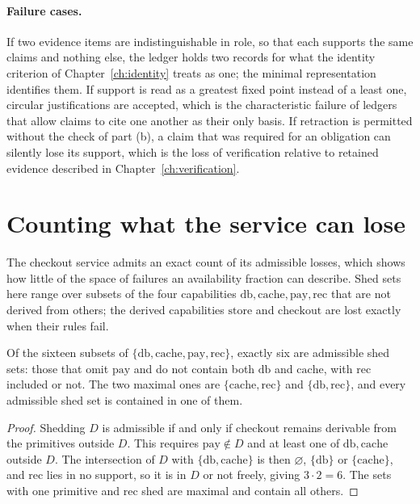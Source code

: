 \paragraph{Failure cases.} If two evidence items are indistinguishable in role, so that each supports the same claims and nothing else, the ledger holds two records for what the identity criterion of Chapter~\ref{ch:identity} treats as one; the minimal representation identifies them. If support is read as a greatest fixed point instead of a least one, circular justifications are accepted, which is the characteristic failure of ledgers that allow claims to cite one another as their only basis. If retraction is permitted without the check of part (b), a claim that was required for an obligation can silently lose its support, which is the loss of verification relative to retained evidence described in Chapter~\ref{ch:verification}.


\section{Counting what the service can lose}\label{sec:service-count}

The checkout service admits an exact count of its admissible losses, which shows how little of the space of failures an availability fraction can describe. Shed sets here range over subsets of the four capabilities $\mathrm{db},\mathrm{cache},\mathrm{pay},\mathrm{rec}$ that are not derived from others; the derived capabilities $\mathrm{store}$ and $\mathrm{checkout}$ are lost exactly when their rules fail.

\begin{newresult}\label{prop:service-count}
Of the sixteen subsets of $\{\mathrm{db},\mathrm{cache},\mathrm{pay},\mathrm{rec}\}$, exactly six are admissible shed sets: those that omit $\mathrm{pay}$ and do not contain both $\mathrm{db}$ and $\mathrm{cache}$, with $\mathrm{rec}$ included or not. The two maximal ones are $\{\mathrm{cache},\mathrm{rec}\}$ and $\{\mathrm{db},\mathrm{rec}\}$, and every admissible shed set is contained in one of them.
\end{newresult}
\begin{proof}
Shedding $D$ is admissible if and only if $\mathrm{checkout}$ remains derivable from the primitives outside $D$. This requires $\mathrm{pay}\notin D$ and at least one of $\mathrm{db},\mathrm{cache}$ outside $D$. The intersection of $D$ with $\{\mathrm{db},\mathrm{cache}\}$ is then $\varnothing$, $\{\mathrm{db}\}$ or $\{\mathrm{cache}\}$, and $\mathrm{rec}$ lies in no support, so it is in $D$ or not freely, giving $3\cdot2=6$. The sets with one primitive and $\mathrm{rec}$ shed are maximal and contain all others.
\end{proof}

